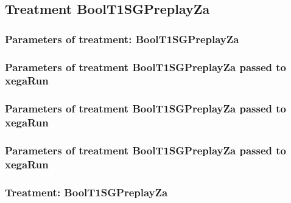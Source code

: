 \documentclass[18pt,c]{beamer}
\begin{document}
\clearpage
\subsection{Treatment BoolT1SGPreplayZa}

 \begin{frame}
 \fontsize{8pt}{9pt}\selectfont
 \frametitle{  Parameters of treatment: BoolT1SGPreplayZa 
 }

 \label{ExpCtParmTable008.tex}  
 \end{frame}


 \begin{frame}
 \fontsize{8pt}{9pt}\selectfont
 \frametitle{  Parameters of treatment BoolT1SGPreplayZa passed to xegaRun
 }

 \label{ExpCtParmTable009.tex}  
 \end{frame}


 \begin{frame}
 \fontsize{8pt}{9pt}\selectfont
 \frametitle{  Parameters of treatment BoolT1SGPreplayZa passed to xegaRun
 }

 \label{ExpCtParmTable010.tex}  
 \end{frame}


 \begin{frame}
 \fontsize{8pt}{9pt}\selectfont
 \frametitle{  Parameters of treatment BoolT1SGPreplayZa passed to xegaRun
 }

 \label{ExpCtParmTable011.tex}  
 \end{frame}

 \begin{frame}
 \fontsize{8pt}{9pt}\selectfont
 \frametitle{ Treatment: BoolT1SGPreplayZa }

 \label{ExpCStatsTable009.tex}  
 \end{frame}
\end{document}
